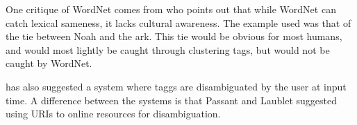 One critique of WordNet comes from \citet{Mika2005} who points out that while WordNet can catch lexical sameness, it lacks cultural awareness. The example used was that of the tie between Noah and the ark.
This tie would be obvious for most humans, and would most lightly be caught through clustering tags, but would not be caught by WordNet.

\citet{Passant2008} has also suggested a system where taggs are disambiguated by the user at input time. A difference between the systems is that Passant and Laublet suggested using URIs to online resources for disambiguation.
